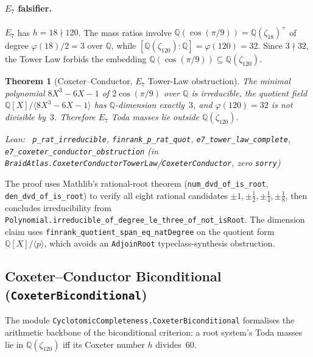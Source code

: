 \documentclass[11pt,a4paper]{article}
\newenvironment{leanref}%
  {\par\smallskip\noindent\begingroup\raggedright\textup{Lean:}~}%
  {\par\endgroup}
\newtheorem{theorem}{Theorem}[section]
\theoremstyle{definition}
\begin{document}
\paragraph{$E_7$ falsifier.}
$E_7$ has $h = 18 \nmid 120$.  The mass ratios involve
$\mathbb{Q}(\cos(\pi/9)) = \mathbb{Q}(\zeta_{18})^+$ of degree
$\varphi(18)/2 = 3$ over $\mathbb{Q}$, while
$[\mathbb{Q}(\zeta_{120}):\mathbb{Q}] = \varphi(120) = 32$.  Since
$3 \nmid 32$, the Tower Law forbids the embedding
$\mathbb{Q}(\cos(\pi/9)) \subseteq \mathbb{Q}(\zeta_{120})$.

\begin{theorem}[Coxeter--Conductor, $E_7$ Tower-Law obstruction]
\label{thm:coxeter_conductor_e7}
The minimal polynomial $8X^3 - 6X - 1$ of $2\cos(\pi/9)$ over $\mathbb{Q}$
is irreducible, the quotient field
$\mathbb{Q}[X]/\langle 8X^3-6X-1\rangle$ has $\mathbb{Q}$-dimension exactly~$3$,
and $\varphi(120) = 32$ is not divisible by~$3$.  Therefore $E_7$ Toda
masses lie outside $\mathbb{Q}(\zeta_{120})$.
\begin{leanref}
\lstinline|p_rat_irreducible|,
\lstinline|finrank_p_rat_quot|,
\lstinline|e7_tower_law_complete|,
\lstinline|e7_coxeter_conductor_obstruction|
\textup{(in \texttt{BraidAtlas.CoxeterConductorTowerLaw}/\texttt{CoxeterConductor},
zero \texttt{sorry})}
\end{leanref}
\end{theorem}

The proof uses Mathlib's rational-root theorem (\texttt{num\_dvd\_of\_is\_root},
\texttt{den\_dvd\_of\_is\_root}) to verify all eight rational candidates
$\pm 1, \pm \tfrac{1}{2}, \pm \tfrac{1}{4}, \pm \tfrac{1}{8}$, then concludes
irreducibility from \texttt{Polynomial.irreducible\_of\_degree\_le\_three\_of\_not\_isRoot}.
The dimension claim uses
\texttt{finrank\_quotient\_span\_eq\_natDegree} on the
quotient form $\mathbb{Q}[X]/\langle p\rangle$, which avoids an
\texttt{AdjoinRoot} typeclass-synthesis obstruction.

\subsection{Coxeter--Conductor Biconditional (\texttt{CoxeterBiconditional})}
\label{sec:coxeter_biconditional}

The module \texttt{CyclotomicCompleteness.CoxeterBiconditional} formalises the arithmetic backbone of the
biconditional criterion: a root system's Toda masses lie in
$\mathbb{Q}(\zeta_{120})$ iff its Coxeter number $h$ divides~$60$.
\end{document}
